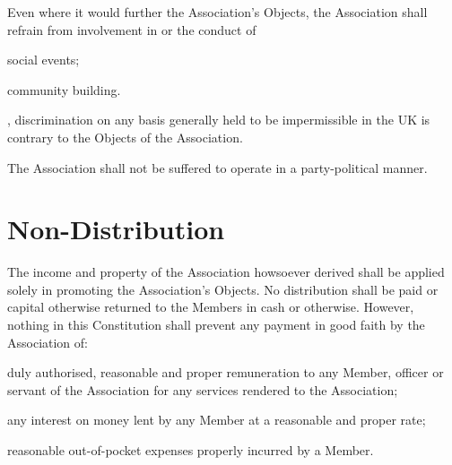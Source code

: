\documentclass[10pt]{mk-articles-of-association}
\begin{document}
\begin{constenum}
\item Even where it would further the Association's Objects, the Association
  shall refrain from involvement in or the conduct of
  \begin{constenum}
  \item social events; \ITand
  \item community building.
  \end{constenum}

\item \avoiddoubt, discrimination on any basis generally held to be
  impermissible in the UK is contrary to the Objects of the
  Association.

\item The Association shall not be suffered to operate in
  a party-political manner.

\end{constenum}



\section{Non-Distribution}

  The income and property of the Association howsoever derived shall be
  applied solely in promoting the Association’s Objects. No distribution shall
  be paid or capital otherwise returned to the Members in cash or otherwise.
  However, nothing in this Constitution shall prevent any payment in good
  faith by the Association of:
  \begin{constenum}
  \item duly authorised, reasonable and proper remuneration to any Member,
    officer or servant of the Association for any services rendered to the
    Association;
  \item any interest on money lent by any Member at a reasonable and proper
    rate; \ITor
  \item reasonable out-of-pocket expenses properly incurred by a Member.
  \end{constenum}



\end{document}
